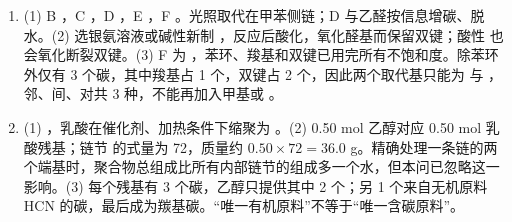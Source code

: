 \documentclass[UTF8,a4paper,zihao=5,oneside,openany,fontset=none]{ctexbook}
\newenvironment{jiexilist}{\small\begin{enumerate}[label={\textbf{\arabic*}.},leftmargin=1.6em,itemsep=0.3em,topsep=0.2em]}{\end{enumerate}}
\begin{document}
\begin{jiexilist}
\item (1) B ，C ，D ，E ，F 。光照取代在甲苯侧链；D 与乙醛按信息增碳、脱水。(2) 选银氨溶液或碱性新制 ，反应后酸化，氧化醛基而保留双键；酸性  也会氧化断裂双键。(3) F 为 ，苯环、羧基和双键已用完所有不饱和度。除苯环外仅有 3 个碳，其中羧基占 1 个，双键占 2 个，因此两个取代基只能为  与 ，邻、间、对共 3 种，不能再加入甲基或 。
\item (1) ，乳酸在催化剂、加热条件下缩聚为 。(2) 0.50 mol 乙醇对应 0.50 mol 乳酸残基；链节  的式量为 72，质量约 $0.50\times72=36.0$ g。精确处理一条链的两个端基时，聚合物总组成比所有内部链节的组成多一个水，但本问已忽略这一影响。(3) 每个残基有 3 个碳，乙醇只提供其中 2 个；另 1 个来自无机原料 HCN 的碳，最后成为羰基碳。“唯一有机原料”不等于“唯一含碳原料”。
\end{jiexilist}
\end{document}
